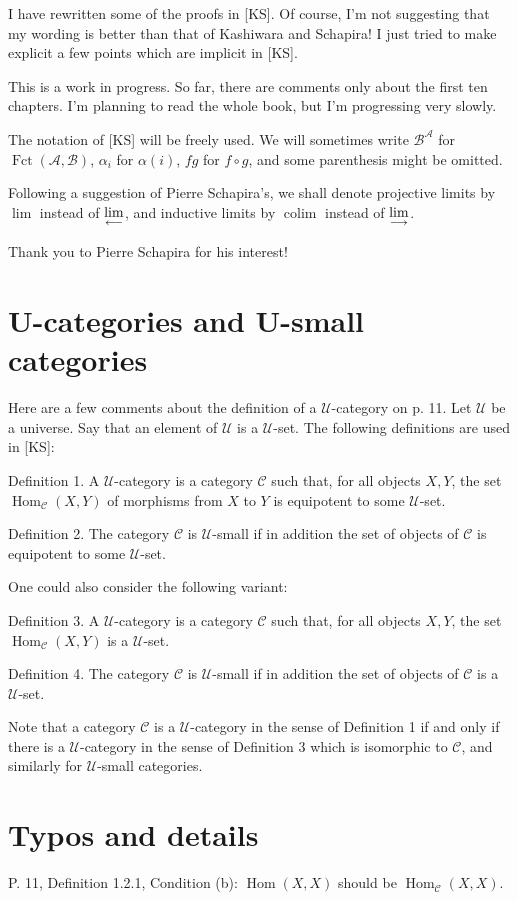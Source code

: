 \documentclass[12pt]{article}
\theoremstyle{remark}
\newcommand{\A}{\mathcal A}
\newcommand{\B}{\mathcal B}
\newcommand{\C}{\mathcal C}
\newcommand{\U}{\mathcal U}
\newcommand{\ilim}{\operatornamewithlimits{\underset{\longrightarrow}{lim}}}
\newcommand{\plim}{\operatornamewithlimits{\underset{\longleftarrow}{lim}}}
\DeclareMathOperator*{\coli}{colim}
\DeclareMathOperator{\Fct}{Fct}
\DeclareMathOperator{\Hom}{Hom}
\begin{document}
I have rewritten some of the proofs in [KS]. Of course, I'm not suggesting that my wording is better than that of Kashiwara and Schapira! I just tried to make explicit a few points which are implicit in [KS]. 

This is a work in progress. So far, there are comments only about the first ten chapters. I'm planning to read the whole book, but I'm progressing very slowly.

The notation of [KS] will be freely used. We will sometimes write $\B^\A$ for $\Fct(\A,\B)$, $\alpha_i$ for $\alpha(i)$, $fg$ for $f\circ g$, and some parenthesis might be omitted. 

Following a suggestion of Pierre Schapira's, we shall denote projective limits by $\lim$ instead of $\plim$, and inductive limits by $\coli$ instead of $\ilim$. 

Thank you to Pierre Schapira for his interest!%
%
\section{U-categories and U-small categories}\label{ucat}
% 
Here are a few comments about the definition of a $\U$-category on p. 11. Let $\U$ be a universe. Say that an element of $\U$ is a $\U$-set. The following definitions are used in [KS]:

Definition 1. A $\U$-category is a category $\C$ such that, for all objects $X,Y$, the set $\Hom_\C(X,Y)$ of morphisms from $X$ to $Y$ is equipotent to some $\U$-set. 

Definition 2. The category $\C$ is $\U$-small if in addition the set of objects of $\C$ is equipotent to some $\U$-set. 

One could also consider the following variant:

Definition 3. A $\U$-category is a category $\C$ such that, for all objects $X,Y$, the set $\Hom_\C(X,Y)$ is a $\U$-set. 

Definition 4. The category $\C$ is $\U$-small if in addition the set of objects of $\C$ is a $\U$-set. 

Note that a category $\C$ is a $\U$-category in the sense of Definition 1 if and only if there is a $\U$-category in the sense of Definition 3 which is isomorphic to $\C$, and similarly for $\U$-small categories.\bigskip

\centerline{}
%
\section{Typos and details}%
%
P. 11, Definition 1.2.1, Condition (b): $\Hom(X,X)$ should be $\Hom_{\C}(X,X)$. 
\end{document}
